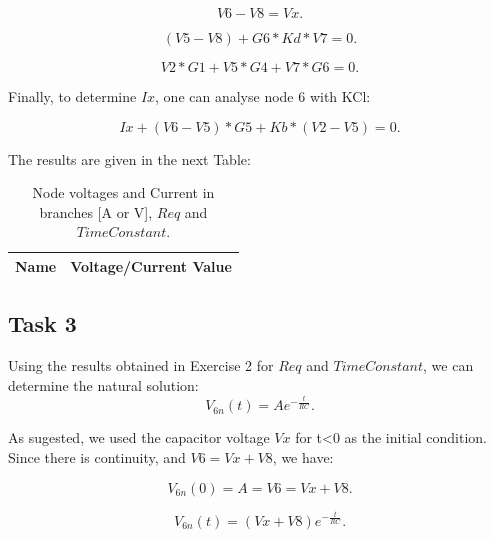 \begin{equation}
  V6 - V8 = Vx.
  \label{eq:n52}
\end{equation}

\begin{equation}
  (V5 - V8) + G6*Kd*V7 = 0.
  \label{eq:n62}
\end{equation}

\begin{equation}
  V2*G1 + V5*G4 + V7*G6 = 0.
  \label{eq:n72}
\end{equation}

Finally, to determine $Ix$, one can analyse node 6 with KCl:

\begin{equation}
  Ix + (V6 - V5)*G5 + Kb*(V2 - V5) = 0.
  \label{eq:Ix}
\end{equation}

The results are given in the next Table: 

 \begin{table}[h]
  \centering
  \begin{tabular}{|l|r|}
    \hline    
    {\bf Name} & {\bf Voltage/Current Value}\\ \hline
    
  \end{tabular}
  \caption{Node voltages and Current in branches [A or V], $Req$ and $Time Constant$.}
  \label{tab:r2}
\end{table}

\subsection{Task 3}

\par Using the results obtained in Exercise 2 for $Req$ and $Time Constant$, we can determine the natural solution:
 \begin{equation}
  V_{6n}(t) = Ae^{-\frac{t}{RC}}.
  \label{eq:v6n}
\end{equation}

\par As sugested, we used the capacitor voltage $Vx$ for t<0 as the initial condition. Since there is continuity, and $V6 = Vx + V8$, we have:

\begin{equation}
  V_{6n}(0) = A = V6 = Vx + V8.
  \label{eq:e31}
\end{equation}

\begin{equation}
  V_{6n}(t) = (Vx + V8)e^{-\frac{t}{RC}}.
  \label{eq:e32}
\end{equation}


